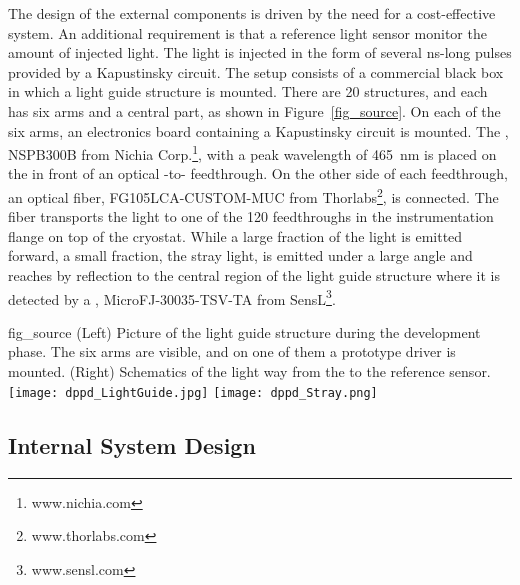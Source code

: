 The design of the external components is driven by the need for a cost-effective system. An additional requirement is that a reference light sensor monitor the amount of injected light. The light is injected in the form of several \si{\ns}-long pulses provided by a Kapustinsky circuit. The setup consists of a commercial black box in which a light guide structure is mounted. There are \num{20} structures, and each has six arms and a central part, as shown in Figure~\ref{fig_source}. On each of the six arms, an electronics board containing a Kapustinsky circuit is mounted. The , NSPB300B from Nichia Corp.\footnote{www.nichia.com}, with a peak wavelength of \SI{465}{nm} is placed  on the  in front of an optical -to- feedthrough. On the other side of each feedthrough, an optical fiber, FG105LCA-CUSTOM-MUC from Thorlabs\footnote{www.thorlabs.com}, is connected. The fiber transports the light to one of the \num{120} feedthroughs in the instrumentation flange on top of the cryostat. While a large fraction of the  light is emitted forward, a small fraction, the stray light, is emitted under a large angle and reaches by reflection to the central region of the light guide structure where it is detected by a , MicroFJ-30035-TSV-TA from SensL\footnote{www.sensl.com}.


\begin{dunefigure}{fig_source}
{(Left) Picture of the light guide structure during the development phase. The six arms are visible, and on one of them a prototype  driver is mounted. (Right) Schematics of the light way from the  to the reference sensor.}
\texttt{[image: dppd\_LightGuide.jpg]}
\texttt{[image: dppd\_Stray.png]}
\end{dunefigure}




\subsection{Internal System Design}

